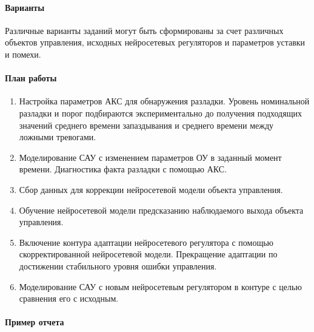 \paragraph{Варианты}

Различные варианты заданий могут быть сформированы за счет различных
объектов управления, исходных нейросетевых регуляторов и параметров
уставки и помехи.

\paragraph{План работы}

\begin{enumerate}
\item Настройка параметров АКС для обнаружения разладки.  Уровень
  номинальной разладки и порог подбираются экспериментально до
  получения подходящих значений среднего времени запаздывания и
  среднего времени между ложными тревогами.
\item Моделирование САУ с изменением параметров ОУ в заданный момент
  времени.  Диагностика факта разладки с помощью АКС.
\item Сбор данных для коррекции нейросетевой модели объекта
  управления.
\item Обучение нейросетевой модели предсказанию наблюдаемого выхода
  объекта управления.
\item Включение контура адаптации нейросетевого регулятора с помощью
  скорректированной нейросетевой модели.  Прекращение адаптации по
  достижении стабильного уровня ошибки управления.
\item Моделирование САУ с новым нейросетевым регулятором в контуре
  с целью сравнения его с исходным.
\end{enumerate}

\paragraph{Пример отчета}
